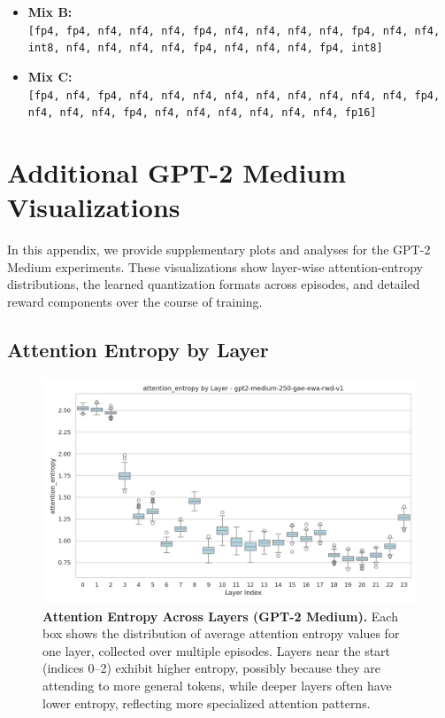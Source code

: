 \documentclass{article}
\begin{document}
{\begin{itemize}
\begin{itemize}
				\item \textbf{Mix B:}\\
				\texttt{[fp4, fp4, nf4, nf4, nf4, fp4, nf4, nf4, nf4, nf4, fp4, nf4, nf4, int8, nf4, nf4, nf4, nf4, fp4, nf4, nf4, nf4, fp4, int8]}
				
				\item \textbf{Mix C:}\\
				\texttt{[fp4, nf4, fp4, nf4, nf4, nf4, nf4, nf4, nf4, nf4, nf4, nf4, fp4, nf4, nf4, nf4, fp4, nf4, nf4, nf4, nf4, nf4, nf4, fp16]}
			\end{itemize}
		\end{itemize}
		
	} %
	
	\section{Additional GPT-2 Medium Visualizations}
	\label{sec:appendix-b}
	
	In this appendix, we provide supplementary plots and analyses for the GPT-2 Medium experiments. These visualizations show layer-wise attention-entropy distributions, the learned quantization formats across episodes, and detailed reward components over the course of training.
	
	\vspace{0.5em}
	\subsection{Attention Entropy by Layer}
	\label{sec:medium-attn-entropy}
	
	\begin{figure}[ht]
		\centering
		\includegraphics[width=1.0\linewidth]{gpt2-medium-250-gae-ewa-rwd-v1_layerstats_attention_entropy.png}
		\caption{\small
			\textbf{Attention Entropy Across Layers (GPT-2 Medium).}
			Each box shows the distribution of average attention entropy values for one layer, collected over multiple episodes. 
			Layers near the start (indices 0--2) exhibit higher entropy, possibly because they are attending to more general tokens, while deeper layers often have lower entropy, reflecting more specialized attention patterns.
		}
		\label{fig:gpt2medium-attn-entropy}
	\end{figure}
	
\end{document}
